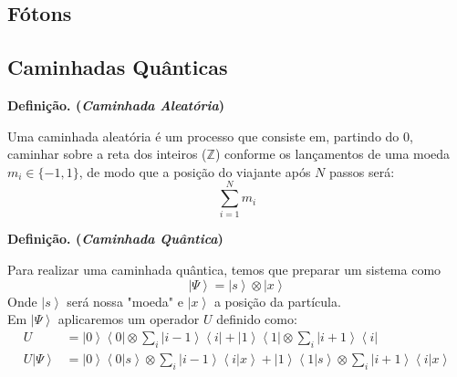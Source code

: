 \documentclass[t]{beamer}
\newcommand{\definicao}[1]{%
	\textbf{Definição. (\emph{#1})\\}
}
\newcommand{\ket}[1]{\ensuremath{\left|#1\right\rangle}}
\newcommand{\braket}[2]{\ensuremath{\left\langle#1|#2\right\rangle}}
\newcommand{\ketbra}[2]{\ensuremath{\left|#1\right\rangle\left\langle#2\right|}}
\begin{document}
	\subsection{Fótons}	
	
	\begin{frame}{\subsecname}
	\end{frame}
	
	\subsection{Caminhadas Quânticas}
	
	\begin{frame}{\subsecname}
		\definicao{Caminhada Aleatória}
		Uma caminhada aleatória é um processo que consiste em, partindo do $0$, caminhar sobre a reta dos inteiros ($\mathbb{Z}$) conforme os lançamentos de uma moeda $m_i \in \{-1, 1\}$, de modo que a posição do viajante após $N$ passos será:
		$$\sum_{i=1}^{N} m_i$$
		\begin{center}
		\end{center}
		
	\end{frame}
	
	\begin{frame}{\subsecname}
		
	\end{frame}

	\begin{frame}{\subsecname}
	\definicao{Caminhada Quântica}
	Para realizar uma caminhada quântica, temos que preparar um sistema como
		$$\ket{\Psi} = \ket{s} \otimes \ket{x}$$
	Onde $\ket{s}$ será nossa "moeda" e $\ket{x}$ a posição da partícula.\\
	
	Em $\ket{\Psi}$ aplicaremos um operador $U$ definido como:
	\footnotesize	
	\begin{align*}
		U &= \ketbra{0}{0} \otimes \sum_{i}\ketbra{i-1}{i} + \ketbra{1}{1} \otimes \sum_{i}\ketbra{i+1}{i}\\
		U \ket{\Psi} &= \ket{0}\braket{0}{s} \otimes \sum_{i}\ket{i-1}\braket{i}{x} + \ket{1}\braket{1}{s} \otimes \sum_{i}\ket{i+1}\braket{i}{x}
	\end{align*}
	\normalsize
	
	\end{frame}
	
\end{document}
